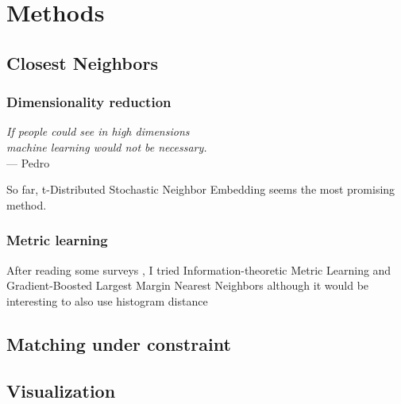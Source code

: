\chapter{Methods}
\label{chap:methods}

\section{Closest Neighbors}

\subsection{Dimensionality reduction}

\begin{flushright}{\slshape
	If people could see in high dimensions \\
	machine learning would not be necessary.
} \\ \medskip
--- Pedro \Textcite{MLKnowledge12}
\end{flushright}

So far, t-Distributed Stochastic Neighbor Embedding \autocite{tSNE08} seems
the most promising method.

\subsection{Metric learning}

After reading some surveys \autocite{MetricSurvey06, MetricSurvey13}, I tried
Information-theoretic Metric Learning \autocite{InfoMetric07} and
Gradient-Boosted Largest Margin Nearest Neighbors \autocite{GBLMNN12} although
it would be interesting to also use histogram distance
\autocite{HistogramDistance02}

\section{Matching under constraint}

\section{Visualization}
